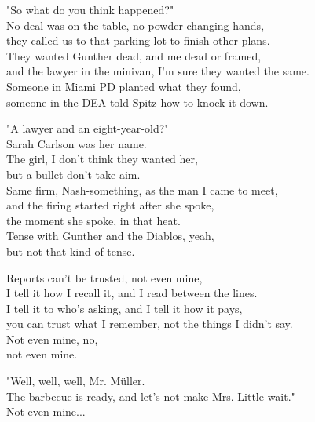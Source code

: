 \begin{lyrics}

"So what do you think happened?"
\\
No deal was on the table, no powder changing hands,\\
they called us to that parking lot to finish other plans.\\
They wanted Gunther dead, and me dead or framed,\\
and the lawyer in the minivan, I'm sure they wanted the same.\\
Someone in Miami PD planted what they found,\\
someone in the DEA told Spitz how to knock it down.

"A lawyer and an eight-year-old?"
\\
Sarah Carlson was her name.\\
The girl, I don't think they wanted her,\\
but a bullet don't take aim.\\
Same firm, Nash-something, as the man I came to meet,\\
and the firing started right after she spoke,\\
the moment she spoke, in that heat.\\
Tense with Gunther and the Diablos, yeah,\\
but not that kind of tense.

Reports can't be trusted, not even mine,\\
I tell it how I recall it, and I read between the lines.\\
I tell it to who's asking, and I tell it how it pays,\\
you can trust what I remember, not the things I didn't say.\\
Not even mine, no,\\
not even mine.

"Well, well, well, Mr. Müller.\\
The barbecue is ready, and let's not make Mrs. Little wait."
\\
Not even mine...
\end{lyrics}


